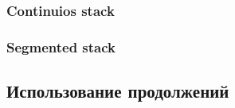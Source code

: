 

\subsubsection{Continuios stack}


\subsubsection{Segmented stack}


\subsection{Использование продолжений}





























\cite{reynolds1972definitional, reynolds1998definitional, defunctionalization-slides}


